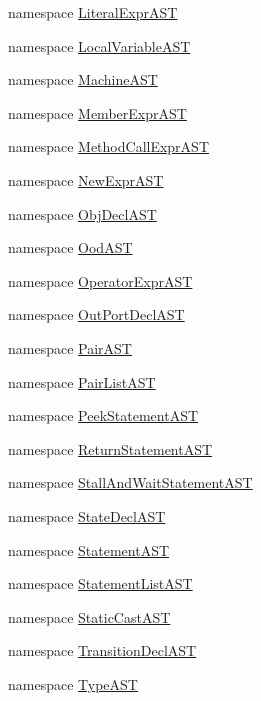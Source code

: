 \begin{DoxyCompactItemize}
\item 
namespace \hyperlink{namespaceslicc_1_1ast_1_1LiteralExprAST}{LiteralExprAST}
\item 
namespace \hyperlink{namespaceslicc_1_1ast_1_1LocalVariableAST}{LocalVariableAST}
\item 
namespace \hyperlink{namespaceslicc_1_1ast_1_1MachineAST}{MachineAST}
\item 
namespace \hyperlink{namespaceslicc_1_1ast_1_1MemberExprAST}{MemberExprAST}
\item 
namespace \hyperlink{namespaceslicc_1_1ast_1_1MethodCallExprAST}{MethodCallExprAST}
\item 
namespace \hyperlink{namespaceslicc_1_1ast_1_1NewExprAST}{NewExprAST}
\item 
namespace \hyperlink{namespaceslicc_1_1ast_1_1ObjDeclAST}{ObjDeclAST}
\item 
namespace \hyperlink{namespaceslicc_1_1ast_1_1OodAST}{OodAST}
\item 
namespace \hyperlink{namespaceslicc_1_1ast_1_1OperatorExprAST}{OperatorExprAST}
\item 
namespace \hyperlink{namespaceslicc_1_1ast_1_1OutPortDeclAST}{OutPortDeclAST}
\item 
namespace \hyperlink{namespaceslicc_1_1ast_1_1PairAST}{PairAST}
\item 
namespace \hyperlink{namespaceslicc_1_1ast_1_1PairListAST}{PairListAST}
\item 
namespace \hyperlink{namespaceslicc_1_1ast_1_1PeekStatementAST}{PeekStatementAST}
\item 
namespace \hyperlink{namespaceslicc_1_1ast_1_1ReturnStatementAST}{ReturnStatementAST}
\item 
namespace \hyperlink{namespaceslicc_1_1ast_1_1StallAndWaitStatementAST}{StallAndWaitStatementAST}
\item 
namespace \hyperlink{namespaceslicc_1_1ast_1_1StateDeclAST}{StateDeclAST}
\item 
namespace \hyperlink{namespaceslicc_1_1ast_1_1StatementAST}{StatementAST}
\item 
namespace \hyperlink{namespaceslicc_1_1ast_1_1StatementListAST}{StatementListAST}
\item 
namespace \hyperlink{namespaceslicc_1_1ast_1_1StaticCastAST}{StaticCastAST}
\item 
namespace \hyperlink{namespaceslicc_1_1ast_1_1TransitionDeclAST}{TransitionDeclAST}
\item 
namespace \hyperlink{namespaceslicc_1_1ast_1_1TypeAST}{TypeAST}
\item 

\end{DoxyCompactItemize}

